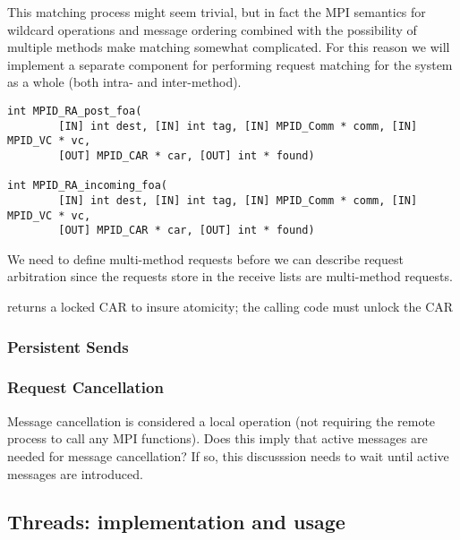 This matching process might seem trivial, but in fact the MPI semantics for
wildcard operations and message ordering combined with the possibility of
multiple methods make matching somewhat complicated.
For this reason we will implement a separate 
component for performing request matching for the
system as a whole (both intra- and inter-method).

\begin{verbatim}
int MPID_RA_post_foa(
        [IN] int dest, [IN] int tag, [IN] MPID_Comm * comm, [IN] MPID_VC * vc,
        [OUT] MPID_CAR * car, [OUT] int * found)

int MPID_RA_incoming_foa(
        [IN] int dest, [IN] int tag, [IN] MPID_Comm * comm, [IN] MPID_VC * vc,
        [OUT] MPID_CAR * car, [OUT] int * found)
\end{verbatim}

\begin{cmt}[BRT]
  We need to define multi-method requests before we can describe request
  arbitration since the requests store in the receive lists are multi-method
  requests.
\end{cmt}

 returns a locked CAR to insure atomicity; the calling
code must unlock the CAR

\subsubsection{Persistent Sends}

\subsubsection{Request Cancellation}

\begin{cmt}
  Message cancellation is considered a local operation (not requiring the
  remote process to call any MPI functions).  Does this imply that active
  messages are needed for message cancellation?  If so, this discusssion needs
  to wait until active messages are introduced.
\end{cmt}


\subsection{Threads: implementation and usage}

